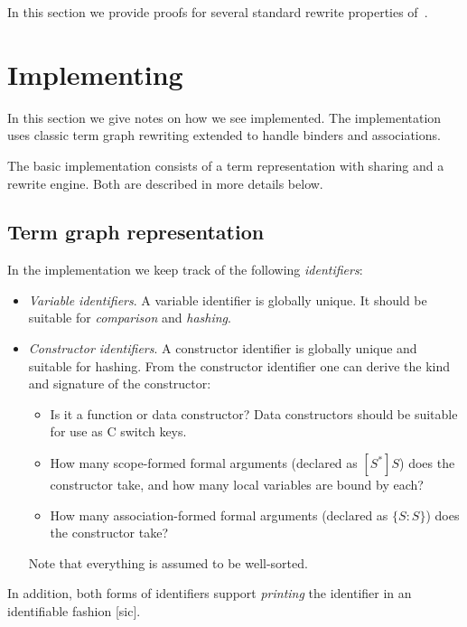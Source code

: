 \documentclass[letterpaper,11pt]{article}
\begin{document}
In this section we provide proofs for several standard rewrite properties of~\hax.




\section{Implementing \hax}
\label{sec:implement}

In this section we give notes on how we see \hax implemented. The implementation uses classic term
graph rewriting extended to handle binders and associations.

The basic \hax implementation consists of a term representation with sharing and a rewrite engine. Both are described
in more details below.     


\subsection{Term graph representation}

\begin{definition}[identifiers]
  In the implementation we keep track of the following \emph{identifiers}:
  \begin{itemize}

  \item \emph{Variable identifiers}. A variable identifier is globally unique. It should be suitable
    for \emph{comparison} and \emph{hashing}.

  \item \emph{Constructor identifiers}. A constructor identifier is globally unique and suitable for
    hashing. From the constructor identifier one can derive the kind and signature of the
    constructor:
    \begin{itemize}
    \item Is it a function or data constructor? Data constructors should be suitable for use as C
      switch keys.
    \item How many scope-formed formal arguments (declared as $[S^*]S$) does the constructor take,
      and how many local variables are bound by each?
    \item How many association-formed formal arguments (declared as $\{S:S\}$) does the constructor
      take?
    \end{itemize}
    Note that everything is assumed to be well-sorted.

  \end{itemize}
  In addition, both forms of identifiers support \emph{printing} the identifier in an identifiable
  fashion [sic].
\end{definition}
\end{document}
